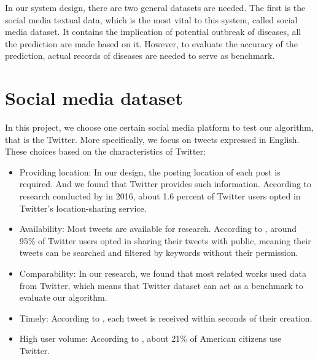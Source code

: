 In our system design, there are two general datasets are needed. The first is the social media textual data, which is the most vital to this system, called social media dataset. It contains the implication of potential outbreak of diseases, all the prediction are made based on it. However, to evaluate the accuracy of the prediction, actual records of diseases are needed to serve as benchmark. 
\section{Social media dataset}
\label{sec:Social media dataset}
In this project, we choose one certain social media platform to test our algorithm, that is the Twitter. More specifically, we focus on tweets expressed in English. These choices based on the characteristics of Twitter:
\begin{itemize}
    \item Providing location: In our design, the posting location of each post is required. And we found that Twitter provides such information. According to research conducted by \cite{greenwood2016social} in 2016, about 1.6 percent of Twitter users opted in Twitter's location-sharing service.
    \item Availability: Most tweets are available for research. According to \cite{serban2019real}, around 95\% of Twitter users opted in sharing their tweets with public, meaning their tweets can be searched and filtered by keywords without their permission.  
    \item Comparability: In our research, we found that most related works used data from Twitter, which means that Twitter dataset can act as a benchmark to evaluate our algorithm.
    \item Timely: According to \cite{serban2019real}, each tweet is received within seconds of their creation.
    \item High user volume: According to \cite{greenwood2016social}, about 21\% of American citizens use Twitter.
\end{itemize} 

